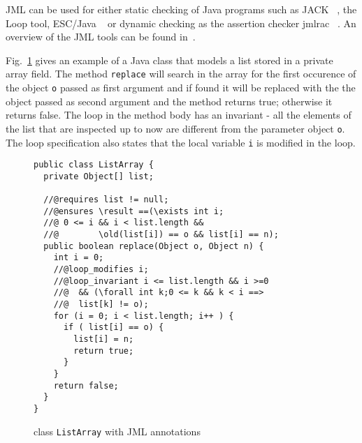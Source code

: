 JML can be used for either static checking of Java programs such as JACK ~\cite{BR02jack}, the Loop tool, 
ESC/Java ~\cite{escjava} or dynamic checking as the assertion checker jmlrac ~\cite{jmlrac}. An overview of the JML tools can 
be found in~\cite{BurdyCCEKLLP03}.
     
Fig.~\ref{replaceSrc} gives an example of a Java class that models a list stored in a private array field. 
The method \texttt{replace} will search in the array for the first occurence of the object \texttt{o} passed as first argument and if found it will be replaced with the 
the object passed as second argument and the method returns true; otherwise it returns false. The loop in the method body has an invariant - all
the elements of the list that are inspected up to now are different from the parameter object \texttt{o}. The loop specification also states
that the local variable \texttt{i} is modified in the loop.
\begin{figure}[ht!]
\begin{verbatim}
public class ListArray {
  private Object[] list;

  //@requires list != null;
  //@ensures \result ==(\exists int i; 
  //@ 0 <= i && i < list.length && 
  //@        \old(list[i]) == o && list[i] == n); 
  public boolean replace(Object o, Object n) {
    int i = 0;
    //@loop_modifies i;
    //@loop_invariant i <= list.length && i >=0 
    //@  && (\forall int k;0 <= k && k < i ==> 
    //@  list[k] != o); 
    for (i = 0; i < list.length; i++ ) {
      if ( list[i] == o) {
        list[i] = n;
        return true;	
      }
    }
    return false;
  }
}
\end{verbatim}
\caption{class \texttt{ListArray} with JML annotations} 
\label{replaceSrc}
\end{figure}


